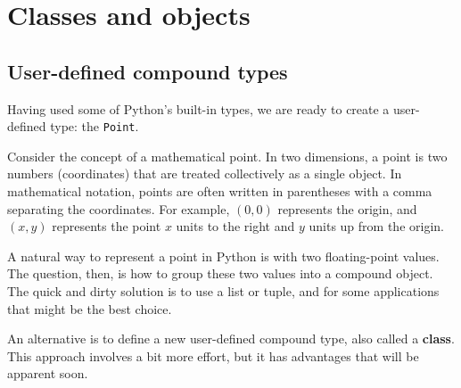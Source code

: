 


\chapter{Classes and objects}


\section{User-defined compound types}
\label{point}

Having used some of Python's built-in types, we are ready to create a
user-defined type: the {\tt Point}.

Consider the concept of a mathematical point.  In two dimensions, a
point is two numbers (coordinates) that are treated collectively as a
single object.  In mathematical notation, points are often written in
parentheses with a comma separating the coordinates. For example,
$(0, 0)$ represents the origin, and $(x, y)$ represents the
point $x$ units to the right and $y$ units up from the origin.

A natural way to represent a point in Python is with two
floating-point values.  The question, then, is how to group these two
values into a compound object.  The quick and dirty solution
is to use a list or tuple, and for some applications that might
be the best choice.


An alternative is to define a new user-defined compound type, also
called a {\bf class}.  This approach involves a bit more effort, but
it has advantages that will be apparent soon.

